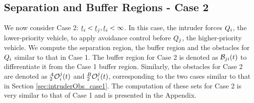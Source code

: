 \subsection{Separation and Buffer Regions - Case 2} \label{sec:case2_maintext}
We now consider Case 2: $\underline{t}_i < \underline{t}_j, \underline{t}_i <\infty$. In this case, the intruder forces $Q_i$, the lower-priority vehicle, to apply avoidance control before $Q_j$, the higher-priority vehicle.  We compute the separation region, the buffer region and the obstacles for $Q_i$ similar to that in Case 1. The buffer region for Case 2 is denoted as $\mathcal{B}_{ji}(t)$ to differentiate it from the Case 1 buffer region. Similarly, the obstacles for Case 2 are denoted as $_2^A\mathcal{O}_i^j(t)$ and $_2^B\mathcal{O}_i^j(t)$, corresponding to the two cases similar to that in Section \eqref{sec:intruderObs_case1}. The computation of these sets for Case 2 is very similar to that of Case 1 and is presented in the Appendix.  
